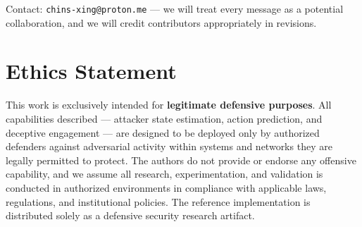 \documentclass[11pt]{article}
\begin{document}
Contact: \texttt{chins-xing@proton.me} --- we will treat every message as a
potential collaboration, and we will credit contributors appropriately in
revisions.

\section*{Ethics Statement}

This work is exclusively intended for \textbf{legitimate defensive
purposes}. All capabilities described --- attacker state estimation, action
prediction, and deceptive engagement --- are designed to be deployed only by
authorized defenders against adversarial activity within systems and
networks they are legally permitted to protect. The authors do not provide
or endorse any offensive capability, and we assume all research,
experimentation, and validation is conducted in authorized environments in
compliance with applicable laws, regulations, and institutional policies.
The reference implementation is distributed solely as a defensive security
research artifact.
\end{document}
